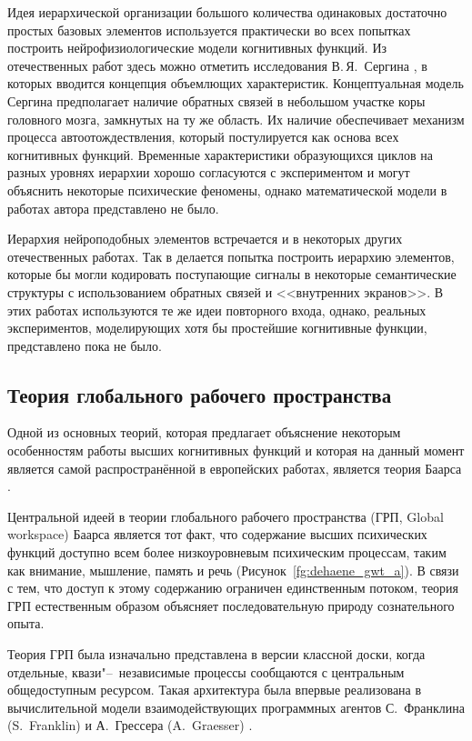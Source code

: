 Идея иерархической организации большого количества одинаковых достаточно простых базовых элементов используется практически во всех попытках построить нейрофизиологические модели когнитивных функций. Из отечественных работ здесь можно отметить исследования В.\,Я.~Сергина \cite{Sergin2008,Sergin2009,Sergin2011}, в которых вводится концепция объемлющих характеристик. Концептуальная модель Сергина предполагает наличие обратных связей в небольшом участке коры головного мозга, замкнутых на ту же область. Их наличие обеспечивает механизм процесса автоотождествления, который постулируется как основа всех когнитивных функций. Временные характеристики образующихся циклов на разных уровнях иерархии хорошо согласуются с экспериментом и могут объяснить некоторые психические феномены, однако математической модели в работах автора представлено не было.

Иерархия нейроподобных элементов встречается и в некоторых других отечественных работах. Так в \cite{Vartanov2011,Chernavsky2012} делается попытка построить иерархию элементов, которые бы могли кодировать поступающие сигналы в некоторые семантические структуры с использованием обратных связей и <<внутренних экранов>>. В этих работах используются те же идеи повторного входа, однако, реальных экспериментов, моделирующих хотя бы простейшие когнитивные функции, представлено пока не было.

\subsection{Теория глобального рабочего пространства}\label{subsect1_2_1}

Одной из основных теорий, которая предлагает объяснение некоторым особенностям работы высших когнитивных функций и которая на данный момент является самой распространённой в европейских работах, является теория Баарса \cite{Baars1988,Baars2005}.

Центральной идеей в теории глобального рабочего пространства (ГРП, Global workspace) Баарса является тот факт, что содержание высших психических функций доступно всем более низкоуровневым психическим процессам, таким как внимание, мышление, память и речь (Рисунок~\ref{fg:dehaene_gwt_a}). В связи с тем, что доступ к этому содержанию ограничен единственным потоком, теория ГРП естественным образом объясняет последовательную природу сознательного опыта.

Теория ГРП была изначально представлена в версии классной доски, когда отдельные, квази"--~независимые процессы сообщаются с центральным общедоступным ресурсом. Такая архитектура была впервые реализована в вычислительной модели взаимодействующих программных агентов С.~Франклина (S.~Franklin) и А.~Грессера (A.~Graesser) \cite{Franklin1999}.

